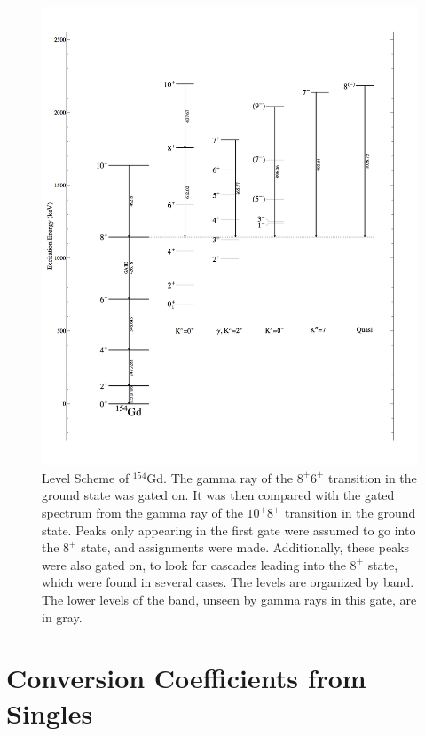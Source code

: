 \begin{figure}[!]
    \centering
    \includegraphics[scale=0.25]{154GdTablesAndFigs/154Gd_8to6.png}
    \caption{Level Scheme of $^{154}$Gd. The gamma ray of the $8^+$\rightarrow$6^+$ transition in the ground state was gated on. It was then compared with the gated spectrum from the gamma ray of the $10^+$\rightarrow$8^+$ transition in the ground state. Peaks only appearing in the first gate were assumed to go into the $8^+$ state, and assignments were made. Additionally, these peaks were also gated on, to look for cascades leading into the $8^+$ state, which were found in several cases. The levels are organized by band. The lower levels of the band, unseen by gamma rays in this gate, are in gray.}
    \label{fig:154_8to6}
\end{figure}

\section{Conversion Coefficients from Singles}
\label{sec:154_Conv_Singles}

\afterpage{\clearpage}

\afterpage{\clearpage}

\afterpage{\clearpage}   

\afterpage{\clearpage}

\afterpage{\clearpage}

\afterpage{\clearpage}

\afterpage{\clearpage}
    